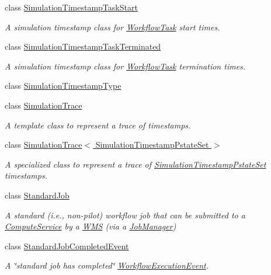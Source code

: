 \begin{DoxyCompactItemize}
class \hyperlink{classwrench_1_1_simulation_timestamp_task_start}{Simulation\+Timestamp\+Task\+Start}
\begin{DoxyCompactList}\small\item\em A simulation timestamp class for \hyperlink{classwrench_1_1_workflow_task}{Workflow\+Task} start times. \end{DoxyCompactList}\item 
class \hyperlink{classwrench_1_1_simulation_timestamp_task_terminated}{Simulation\+Timestamp\+Task\+Terminated}
\begin{DoxyCompactList}\small\item\em A simulation timestamp class for \hyperlink{classwrench_1_1_workflow_task}{Workflow\+Task} termination times. \end{DoxyCompactList}\item 
class \hyperlink{classwrench_1_1_simulation_timestamp_type}{Simulation\+Timestamp\+Type}
\item 
class \hyperlink{classwrench_1_1_simulation_trace}{Simulation\+Trace}
\begin{DoxyCompactList}\small\item\em A template class to represent a trace of timestamps. \end{DoxyCompactList}\item 
class \hyperlink{classwrench_1_1_simulation_trace_3_01_simulation_timestamp_pstate_set_01_4}{Simulation\+Trace$<$ Simulation\+Timestamp\+Pstate\+Set $>$}
\begin{DoxyCompactList}\small\item\em A specialized class to represent a trace of \hyperlink{classwrench_1_1_simulation_timestamp_pstate_set}{Simulation\+Timestamp\+Pstate\+Set} timestamps. \end{DoxyCompactList}\item 
class \hyperlink{classwrench_1_1_standard_job}{Standard\+Job}
\begin{DoxyCompactList}\small\item\em A standard (i.\+e., non-\/pilot) workflow job that can be submitted to a \hyperlink{classwrench_1_1_compute_service}{Compute\+Service} by a \hyperlink{classwrench_1_1_w_m_s}{W\+MS} (via a \hyperlink{classwrench_1_1_job_manager}{Job\+Manager}) \end{DoxyCompactList}\item 
class \hyperlink{classwrench_1_1_standard_job_completed_event}{Standard\+Job\+Completed\+Event}
\begin{DoxyCompactList}\small\item\em A \char`\"{}standard job has completed\char`\"{} \hyperlink{classwrench_1_1_workflow_execution_event}{Workflow\+Execution\+Event}. \end{DoxyCompactList}\item 

\end{DoxyCompactItemize}
